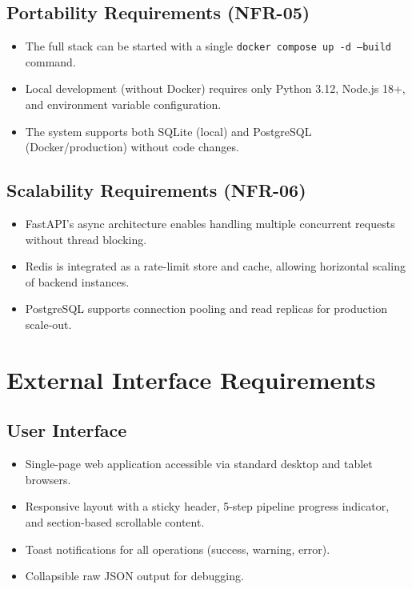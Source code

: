 \documentclass[12pt,a4paper]{report}
\begin{document}
\subsection{Portability Requirements (NFR-05)}
\begin{itemize}
    \item The full stack can be started with a single \texttt{docker compose up -d --build} command.
    \item Local development (without Docker) requires only Python 3.12, Node.js 18+, and environment variable configuration.
    \item The system supports both SQLite (local) and PostgreSQL (Docker/production) without code changes.
\end{itemize}

\subsection{Scalability Requirements (NFR-06)}
\begin{itemize}
    \item FastAPI's async architecture enables handling multiple concurrent requests without thread blocking.
    \item Redis is integrated as a rate-limit store and cache, allowing horizontal scaling of backend instances.
    \item PostgreSQL supports connection pooling and read replicas for production scale-out.
\end{itemize}

\section{External Interface Requirements}

\subsection{User Interface}
\begin{itemize}
    \item Single-page web application accessible via standard desktop and tablet browsers.
    \item Responsive layout with a sticky header, 5-step pipeline progress indicator, and section-based scrollable content.
    \item Toast notifications for all operations (success, warning, error).
    \item Collapsible raw JSON output for debugging.
\end{itemize}
\end{document}
